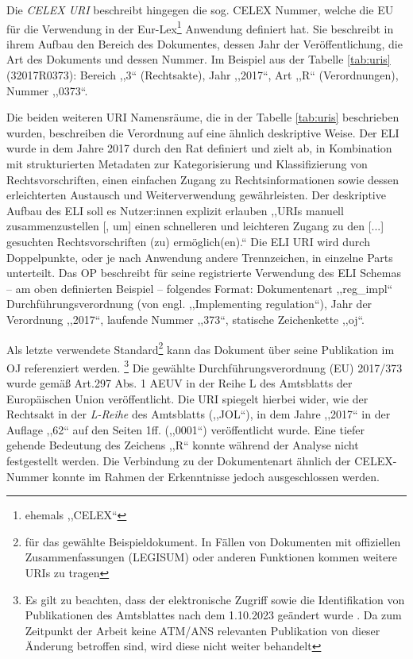 Die \textit{CELEX URI} beschreibt hingegen die sog. CELEX Nummer, welche die EU für die Verwendung in der Eur-Lex\footnote{ehemals ,,CELEX``} Anwendung definiert hat.
Sie beschreibt in ihrem Aufbau den Bereich des Dokumentes, dessen Jahr der Veröffentlichung, die Art des Dokuments und dessen Nummer. \cite[2, 24]{eu_celex}
Im Beispiel aus der Tabelle \ref{tab:uris} (32017R0373): Bereich ,,3`` (Rechtsakte), Jahr ,,2017``, Art ,,R`` (Verordnungen), Nummer ,,0373``.

Die beiden weiteren URI Namensräume, die in der Tabelle \ref{tab:uris} beschrieben wurden, beschreiben die Verordnung auf eine ähnlich deskriptive Weise.
Der \acf{ELI} wurde in dem Jahre 2017 durch den Rat definiert und zielt ab, in Kombination mit strukturierten Metadaten zur Kategorisierung und Klassifizierung von Rechtsvorschriften, einen einfachen Zugang zu Rechtsinformationen sowie dessen erleichterten Austausch und Weiterverwendung gewährleisten. \cite[Art. 5]{52017XG1222}
Der deskriptive Aufbau des \ac{ELI} soll es Nutzer:innen explizit erlauben ,,\acp{URI} manuell zusammenzustellen [, um] einen schnelleren und leichteren Zugang zu den [...] gesuchten Rechtsvorschriften (zu) ermöglich(en).``\cite[Art. 6c]{52017XG1222}
Die \ac{ELI} \ac{URI} wird durch Doppelpunkte, oder je nach Anwendung andere Trennzeichen, in einzelne Parts unterteilt.
Das \acf{OP} beschreibt für seine registrierte Verwendung des ELI Schemas -- am oben definierten Beispiel -- folgendes Format: 
Dokumentenart ,,reg\_impl`` Durchführungsverordnung (von engl. ,,Implementing regulation``), Jahr der Verordnung ,,2017``,  laufende Nummer ,,373``, statische Zeichenkette ,,oj``. \cite[vgl.][]{eu_op_eli_register}

Als letzte verwendete Standard\footnote{für das gewählte Beispieldokument. In Fällen von Dokumenten mit offiziellen Zusammenfassungen (LEGISUM) oder anderen Funktionen kommen weitere \acp{URI} zu tragen} kann das Dokument über seine Publikation im \acf{OJ} referenziert werden. \footnote{Es gilt zu beachten, dass der elektronische Zugriff sowie die Identifikation von Publikationen des Amtsblattes nach dem 1.10.2023 geändert wurde \cite[siehe][]{eu_oj_actbyact}. Da zum Zeitpunkt der Arbeit keine ATM/ANS relevanten Publikation von dieser Änderung betroffen sind, wird diese nicht weiter behandelt}
Die gewählte Durchführungsverordnung (EU) 2017/373 wurde gemäß Art.297 Abs. 1 \ac{AEUV} in der Reihe L des Amtsblatts der Europäischen Union veröffentlicht. 
Die \ac{URI} spiegelt hierbei wider, wie der Rechtsakt in der \textit{L-Reihe} des Amtsblatts (,,JOL``), in dem Jahre ,,2017`` in der Auflage ,,62`` auf den Seiten 1ff. (,,0001``) veröffentlicht wurde.
Eine tiefer gehende Bedeutung des Zeichens ,,R`` konnte während der Analyse nicht festgestellt werden.
Die Verbindung zu der Dokumentenart ähnlich der CELEX-Nummer konnte im Rahmen der Erkenntnisse jedoch ausgeschlossen werden. 

